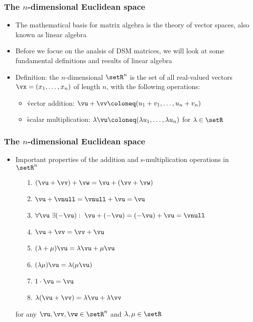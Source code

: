 \begin{frame}
  \frametitle{The $n$-dimensional Euclidean space}

  \begin{itemize}
  \item The mathematical basis for matrix algebra is the theory of
    vector spaces, also known as \h{linear algebra}
  \item Before we focue on the analsis of DSM matrices, we will look at some
    fundamental definitions and results of linear algebra
  \item[]\pause
  \item Definition: the $n$-dimensional  $\setR^n$ is
    the set of all real-valued vectors $\vx = (x_1, \ldots, x_n)$ of length $n$,
    with the following operations:
    \begin{itemize}
    \item \h{vector addition}: $\vu + \vv \coloneq (u_1+v_1, \ldots, u_n+v_n)$
    \item \h{scalar multiplication}: $\lambda \vu \coloneq (\lambda u_1,
      \ldots, \lambda u_n)$  for $\lambda\in\setR$
    \end{itemize}
  \end{itemize}
\end{frame}

\begin{frame}
  \frametitle{The $n$-dimensional Euclidean space}

  \begin{itemize}
  \item Important properties of the addition and s-multiplication
    operations in $\setR^n$
    \begin{enumerate}
    \item[1.] $(\vu + \vv) + \vw = \vu + (\vv + \vw)$
    \item[2.] $\vu + \vnull = \vnull + \vu = \vu$
    \item[3.] $\forall \vu\; \exists (-\vu):\; \vu + (-\vu) = (-\vu) + \vu = \vnull$
    \item[4.] $\vu + \vv = \vv + \vu$
    \item[5.] $(\lambda + \mu) \vu = \lambda \vu + \mu \vu$
    \item[6.] $(\lambda \mu) \vu = \lambda (\mu \vu)$
    \item[7.] $1\cdot \vu = \vu$
    \item[8.] $\lambda (\vu + \vv) = \lambda \vu + \lambda \vv$
    \end{enumerate}
    for any $\vu, \vv, \vw\in \setR^n$ and $\lambda,\mu \in \setR$
  \end{itemize}
\end{frame}

